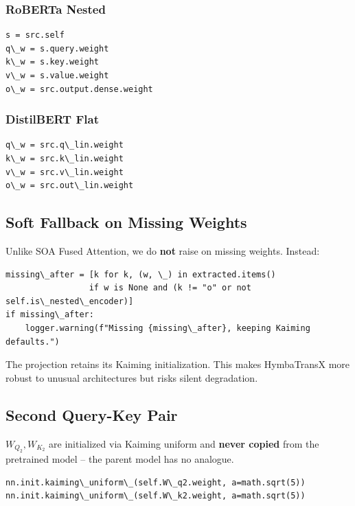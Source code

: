 \subsubsection{RoBERTa Nested}

\begin{lstlisting}
s = src.self
q\_w = s.query.weight
k\_w = s.key.weight
v\_w = s.value.weight
o\_w = src.output.dense.weight
\end{lstlisting}

\subsubsection{DistilBERT Flat}

\begin{lstlisting}
q\_w = src.q\_lin.weight
k\_w = src.k\_lin.weight
v\_w = src.v\_lin.weight
o\_w = src.out\_lin.weight
\end{lstlisting}

\subsection{Soft Fallback on Missing Weights}

Unlike SOA Fused Attention, we do \textbf{not} raise on missing weights. Instead:

\begin{lstlisting}
missing\_after = [k for k, (w, \_) in extracted.items() 
                 if w is None and (k != "o" or not self.is\_nested\_encoder)]
if missing\_after:
    logger.warning(f"Missing {missing\_after}, keeping Kaiming defaults.")
\end{lstlisting}

The projection retains its Kaiming initialization. This makes HymbaTransX 
more robust to unusual architectures but risks silent degradation.

\subsection{Second Query-Key Pair}

$W_{Q_2}, W_{K_2}$ are initialized via Kaiming uniform and \textbf{never copied} 
from the pretrained model -- the parent model has no analogue.

\begin{lstlisting}
nn.init.kaiming\_uniform\_(self.W\_q2.weight, a=math.sqrt(5))
nn.init.kaiming\_uniform\_(self.W\_k2.weight, a=math.sqrt(5))
\end{lstlisting}

